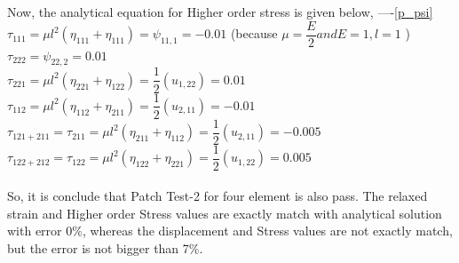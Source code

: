 \documentclass[12pt]{article}
\begin{document}
Now, the analytical equation for Higher order stress is given below, ----\ref{p_psi}\\
$\tau_{111} = \mu l^2 (\eta_{111} + \eta_{111}) = \psi_{11,1} = -0.01$  (because $\mu = \dfrac{E}{2} and E=1,l=1$ ) \\ 
$\tau_{222} = \psi_{22,2} = 0.01$    \\
$\tau_{221} = \mu l^2 (\eta_{221} + \eta_{122}) = \dfrac{1}{2}(u_{1,22}) = 0.01$ \\
$\tau_{112} = \mu l^2 (\eta_{112} + \eta_{211}) = \dfrac{1}{2}(u_{2,11}) = -0.01$ \\
$\tau_{121+211} = \tau_{211} = \mu l^2 (\eta_{211} + \eta_{112}) = \dfrac{1}{2}(u_{2,11}) = -0.005$ \\
$\tau_{122+212} = \tau_{122} = \mu l^2 (\eta_{122} + \eta_{221}) = \dfrac{1}{2}(u_{1,22}) = 0.005$ \\ \\
So, it is conclude that Patch Test-2 for four element is also pass. The relaxed strain and Higher order Stress values are exactly match with analytical solution with error 0$\%$, whereas the displacement and Stress values are not exactly match, but the error is not bigger than 7$\%$.
\end{document}
